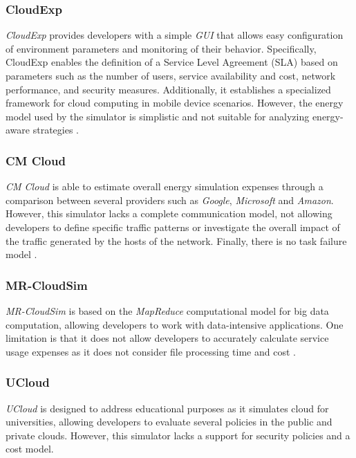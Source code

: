 {\subsubsection*{CloudExp}
\emph{CloudExp} \cite{jararweh2014cloudexp} provides developers with a simple \emph{GUI} that allows easy configuration of environment parameters and monitoring of their behavior. Specifically, CloudExp enables the definition of a Service Level Agreement (SLA) based on parameters such as the number of users, service availability and cost, network performance, and security measures. Additionally, it establishes a specialized framework for cloud computing in mobile device scenarios. However, the energy model used by the simulator is simplistic and not suitable for analyzing energy-aware strategies \cite{mansouri2020cloud} \cite{khalil2017cloud}.
\subsubsection*{CM Cloud}
\emph{CM Cloud} \cite{alves2016cm} is able to estimate overall energy simulation expenses through a comparison between several providers such as \emph{Google}, \emph{Microsoft} and \emph{Amazon}. However, this simulator lacks a complete communication model, not allowing developers to define specific traffic patterns or investigate the overall impact of the traffic generated by the hosts of the network. Finally, there is no task failure model \cite{mansouri2020cloud}.
\subsubsection*{MR-CloudSim}
\emph{MR-CloudSim} \cite{jung2012mr} is based on the \emph{MapReduce} computational model \cite{dean2008mapreduce} for big data computation, allowing developers to work with data-intensive applications. One limitation is that it does not allow developers to accurately calculate service usage expenses as it does not consider file processing time and cost \cite{mansouri2020cloud}.
\subsubsection*{UCloud}
\emph{UCloud} \cite{sqalli2012ucloud} is designed to address educational purposes as it simulates cloud for universities, allowing developers to evaluate several policies in the public and private clouds. However, this simulator lacks a support for security policies and a cost model. \cite{mansouri2020cloud}
}
